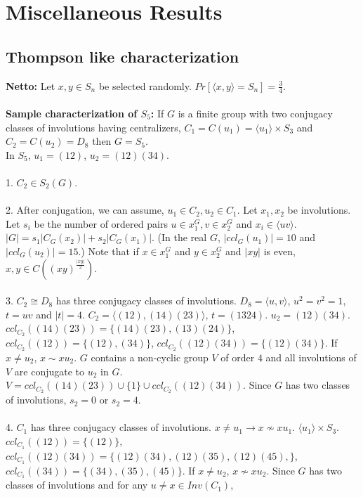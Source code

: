 \chapter{Miscellaneous Results}
\section{Thompson like characterization}
{\bf Netto:}  Let $x,y \in S_n$ be selected randomly.  
$Pr[ \langle x,y \rangle =S_n]= {\frac 3 4}$.  
\\
\\
{\bf Sample characterization of $S_5$:}
If $G$ is a finite group with two conjugacy classes of involutions having
centralizers, $C_1= C(u_1) = \langle u_1 \rangle \times S_3$ and
$C_2= C(u_2) = D_8$ then $G = S_5$.
\\
In $S_5$, $u_1= (12)$, $u_2= (12)(34)$.
\\
\\
1. $C_2 \in S_2(G)$.
\\
\\
2.  After conjugation, we can assume, $u_1 \in C_2, u_2 \in C_1$.
Let $x_1, x_2$ be involutions.  Let $s_i$ be the number of ordered pairs
$u \in x_1^G, v \in x_2^G$ and $x_i \in \langle uv \rangle
$.  $|G|= s_1|C_G(x_2)| + s_2 |C_G(x_1)|$.
(In the real $G$, $|ccl_G(u_1)| = 10$ and $|ccl_G(u_2)|= 15$.)
Note that if 
$x \in x_1^G$ and $y \in x_2^G$ and $|xy|$ is even, $x,y \in C((xy)^{\frac {|xy|} 2})$.
\\
\\
3. 
$C_2 \cong D_8$ has three conjugacy classes of involutions.  
$D_8= \langle u, v \rangle $, $u^2=v^2=1$, $t= uv$ and $|t| = 4$.
$C_2= \langle (12),(14)(23) \rangle $, $t= (1324)$.
$u_2= (12)(34)$.
$ccl_{C_2}((14)(23))= \{ (14)(23), (13)(24) \}$,
$ccl_{C_2}((12))= \{ (12), (34) \}$,
$ccl_{C_2}((12)(34))= \{ (12)(34) \}$.  If $x \ne u_2$, $ x \sim x u_2$.
$G$ contains a non-cyclic group $V$ of order $4$
and all involutions of $V$ are conjugate to $u_2$ in $G$.
$V= ccl_{C_2}((14)(23)) \cup \{ 1 \} \cup ccl_{C_2}((12)(34))$.
Since $G$ has two classes of involutions, $s_2 = 0$ or $s_2 = 4$.
\\
\\
4.
$C_1$ has three conjugacy classes of involutions.  $x \ne u_1 \rightarrow x \nsim x u_1$.
$ \langle u_1 \rangle \times S_3$. 
$ccl_{C_1}((12))= \{ (12) \}$,
$ccl_{C_1}((12)(34))= \{ 
(12)(34), 
(12)(35), 
(12)(45), 
\}$, $ccl_{C_1}((34))= \{ (34) , (35), (45) \}$.  If $x \ne u_2$, $ x \nsim x u_2$.
Since $G$ has two classes of involutions and for any $u \ne x \in Inv(C_1 )$,

